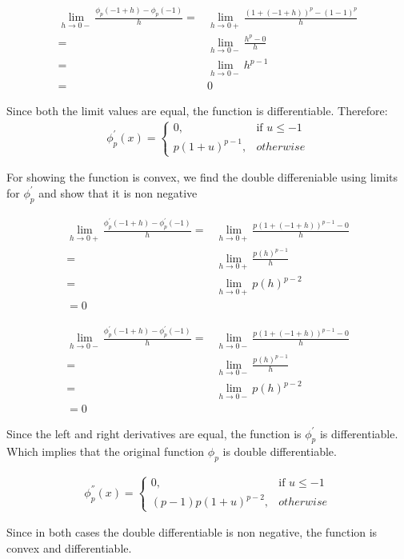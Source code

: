 \documentclass{article}
\begin{document}
\begin{description}
    \begin{align*}
      \lim_{h \to 0-} \frac{\phi_{p}(-1 + h) - \phi_{p}(-1)}{h}=&  \lim_{h \to 0+} \frac{{(1 + (-1 + h))}^{p} - {(1 -1)}^{p}}{h} \\
      = & \lim_{h \to 0-} \frac{h^{p} - 0}{h} \\
      = & \lim_{h \to 0-} h^{p - 1} \\
      = & 0
    \end{align*}

    Since both the limit values are equal, the function is differentiable. Therefore:
    \begin{align*}
        \phi^{'}_{p}\left(x\right) = 
        \begin{cases}
          0, & \textrm{if } u \le -1 \\
          p{(1+u)}^{p-1}, & otherwise
        \end{cases}
    \end{align*}

    For showing the function is convex, we find the double differeniable using limits for \( \phi^{'}_{p} \) and show that it is non negative

    \begin{align*}
      \lim_{h \to 0+} \frac{\phi^{'}_{p}(-1+h) - \phi^{'}_{p}(-1) }{h} = & \lim_{h \to 0+} \frac{p{(1 + (-1 + h))}^{p-1} - 0}{h} \\
      = & \lim_{h \to 0+} \frac{p{(h)}^{p-1}}{h} \\
      = & \lim_{h \to 0+} p{(h)}^{p-2} \\
      = 0
    \end{align*}

    \begin{align*}
      \lim_{h \to 0-} \frac{\phi^{'}_{p}(-1+h) - \phi^{'}_{p}(-1) }{h} = & \lim_{h \to 0-} \frac{p{(1 + (-1 + h))}^{p-1} - 0}{h} \\
      = & \lim_{h \to 0-} \frac{p{(h)}^{p-1}}{h} \\
      = & \lim_{h \to 0-} p{(h)}^{p-2} \\
      = 0
    \end{align*}

    Since the left and right derivatives are equal, the function is \( \phi^{'}_{p} \) is differentiable.  Which implies that the original function \( \phi_{p}\) is double differentiable.

    \begin{align*}
        \phi^{''}_{p}\left(x\right) = 
        \begin{cases}
          0, & \textrm{if } u \le -1 \\
          (p-1)p{(1+u)}^{p-2}, & otherwise
        \end{cases}
    \end{align*}
    
    Since in both cases the double differentiable is non negative, the function is convex and differentiable.

\end{description}
\end{document}
